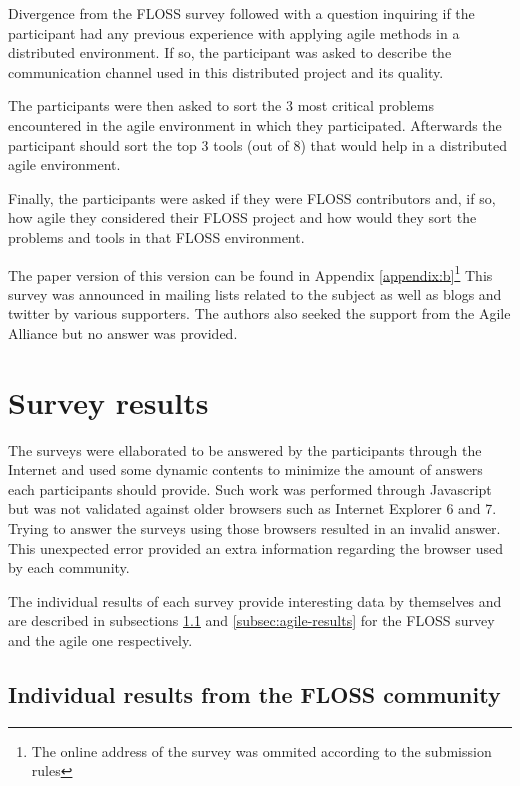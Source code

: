 \documentclass[lnbip]{svmultln}
\begin{document}
Divergence from the FLOSS survey followed with a question inquiring if
the participant had any previous experience with applying agile
methods in a distributed environment. If so, the participant was asked
to describe the communication channel used in this distributed project
and its quality.

The participants were then asked to sort the 3 most critical problems
encountered in the agile environment in which they
participated. Afterwards the participant should sort the top 3 tools
(out of 8) that would help in a distributed agile environment.

Finally, the participants were asked if they were FLOSS contributors
and, if so, how agile they considered their FLOSS project and how
would they sort the problems and tools in that FLOSS environment.

The paper version of this version can be found in Appendix
\ref{appendix:b}\footnote{The online address of the survey was ommited
  according to the submission rules}
This survey was announced in mailing lists related to the subject as
well as blogs and twitter by various supporters. The authors also
seeked the support from the Agile Alliance but no answer was provided.

\section{Survey results}
\label{sec:results}

The surveys were ellaborated to be answered by the participants
through the Internet and used some dynamic contents to minimize the
amount of answers each participants should provide. Such work was
performed through Javascript but was not validated against older
browsers such as Internet Explorer 6 and 7. Trying to answer the
surveys using those browsers resulted in an invalid answer. This
unexpected error provided an extra information regarding the browser
used by each community.

The individual results of each survey provide interesting data by
themselves and are described in subsections \ref{subsec:floss-results}
and \ref{subsec:agile-results} for the FLOSS survey and the agile one
respectively.

\subsection{Individual results from the FLOSS community}
\label{subsec:floss-results}
\end{document}
